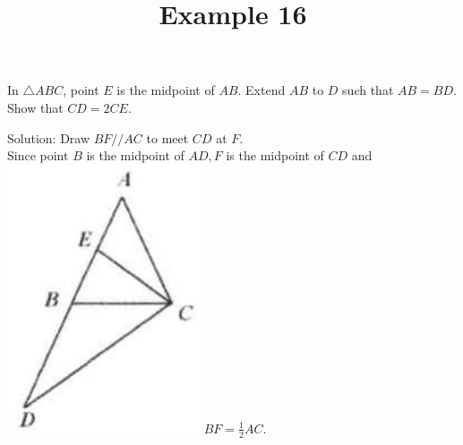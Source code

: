 \documentclass{article}
\title{Example 16}
\date{}
\begin{document}
\maketitle

In \(\triangle A B C\), point \(E\) is the midpoint of \(A B\). Extend \(A B\) to \(D\) such that \(A B=B D\). Show that \(C D=2 C E\).

Solution:
Draw \(B F / / A C\) to meet \(C D\) at \(F\).\\
Since point \(B\) is the midpoint of \(A D, F\) is the midpoint of \(C D\) and\\
\includegraphics[width=\textwidth]{images/problem_image_1.jpg} \(B F=\frac{1}{2} A C\).
\end{document}
